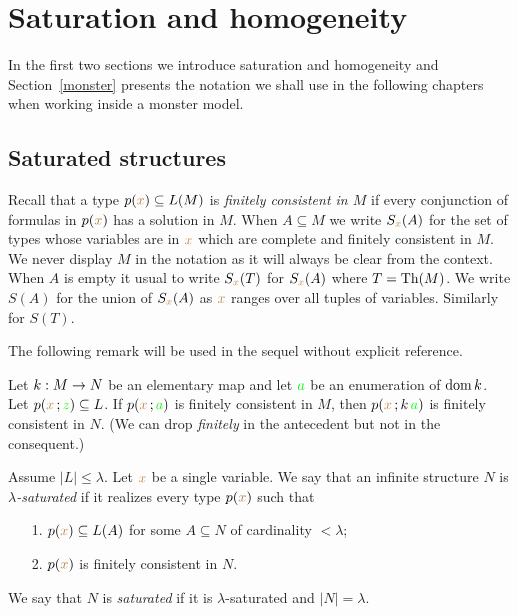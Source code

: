 \chapter{Saturation and homogeneity}
\label{saturation}
 
\def\medrel#1{\parbox{6ex}{$\displaystyle\hfil #1$}}
\def\ceq#1#2#3{\parbox[b]{25ex}{$\displaystyle #1$}\medrel{#2}$\displaystyle  #3$}

In the first two sections we introduce saturation and homogeneity and Section~\ref{monster} presents the notation we shall use in the following chapters when working inside a monster model.

\section{Saturated structures}\label{saturation_section}

Recall that a type $p({\color{brown} x})\subseteq L(M)$ is \emph{finitely consistent in $M$\/} if every conjunction of formulas in $p({\color{brown} x})$ has a solution in $M$.
%
When $A\subseteq M$ we write $S_{\color{brown} x}(A)$ for the set of types whose variables are in ${\color{brown} x}$ which are complete and finitely consistent in $M$.
We never display $M$ in the notation as it will always be clear from the context.
When $A$ is empty it usual to write $S_{\color{brown} x}(T)$ for $S_{\color{brown} x}(A)$ where $T={\rm Th}(M)$.
We write $S(A)$ for the union of $S_{\color{brown} x}(A)$ as ${\color{brown} x}$ ranges over all tuples of variables. Similarly for $S(T)$.

The following remark will be used in the sequel without explicit reference.

\begin{remark}
Let $k:M\rightarrow N$ be an elementary map and let ${\color{green} a}$ be an enumeration of $\mathop{\rm dom} k$. Let $p({\color{brown} x}\,;{\color{green} z})\subseteq L$. If $p({\color{brown} x}\,;{\color{green} a})$ is finitely consistent in $M$, then $p({\color{brown} x}\,;k\,{\color{green} a})$ is finitely consistent in $N$. (We can drop \textit{finitely} in the antecedent but not in the consequent.)
\end{remark}

\begin{definition}\label{def_saturation}
  Assume $|L|\le\lambda$.
  Let ${\color{brown} x}$ be a single variable.
  We say that an infinite structure $N$ is \emph{$\lambda$-saturated} if it realizes every type $p({\color{brown} x})$ such that
  \begin{itemize}
  \item[1.] $p({\color{brown} x})\subseteq L(A)$ for some $A\subseteq N$ of cardinality $<\lambda$;
  \item[2.] $p({\color{brown} x})$ is finitely consistent in $N$.
  \end{itemize}
  We say that $N$ is \emph{saturated\/} if it is $\lambda$-saturated and $|N|=\lambda$.
  \end{definition}
  
